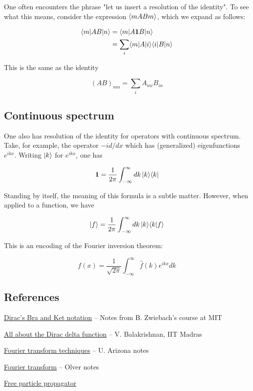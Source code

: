 One often encounters the phrase "let us insert a resolution of the identity".  To see what this means, consider the expression $\langle m AB m \rangle$, which we expand as follows:

\begin{align}
\langle m | AB  | n \rangle  &= \langle m | A {\bf 1}B | n \rangle \\
&= \sum_i \langle m | A | i \rangle \langle i | B | n \rangle
\end{align}

This is the same as the identity

\begin{equation}
(AB)_{mn} = \sum_i A_{mi} B_{in}
\end{equation}

\subsection{Continuous spectrum}

One also has resolution of the identity for operators with continuous spectrum.  Take, for example, the operator $-id/dx$ which has (generalized) eigenfunctions $e^{ikx}$. Writing $| k \rangle$ for $e^{ikx}$, one has

\begin{equation}
{\bf 1} = \frac{1}{2\pi} \int_{-\infty}^\infty dk\, | k \rangle \langle k |  
\end{equation}

Standing by itself, the meaning of this formula is a subtle matter.  However, when applied to a function, we have

\begin{equation}
| f \rangle = \frac{1}{2\pi} \int_{-\infty}^\infty dk\, | k \rangle \langle k | f \rangle 
\end{equation}

This is an encoding of the Fourier inversion theorem:

\begin{equation}
f(x) = \frac{1}{\sqrt{2\pi}} \int_{-\infty}^\infty \hat f(k) e^{ikx} dk
\end{equation}



\subsection{References}

\href{http://ocw.mit.edu/courses/physics/8-05-quantum-physics-ii-fall-2013/lecture-notes/MIT8_05F13_Chap_04.pdf}{Dirac's Bra and Ket notation} -- Notes from B. Zwiebach's course at MIT

\href{http://www.physics.iitm.ac.in/~labs/dynamical/pedagogy/vb/delta.pdf}{All about the Dirac delta function} -- V. Balakrishnan, IIT Madras

\href{http://math.arizona.edu/~kglasner/math456/fouriertransform.pdf}{Fourier transform techniques} -- U. Arizona notes

\href{https://www.math.utah.edu/~gustafso/s2013/3150/pdeNotes/fourierTransorm-PeterOlver2013.pdf}{Fourier transform} -- Olver notes

\href{http://www.physics.rutgers.edu/~steves/501/Lectures_Final/Lec06_Propagator.pdf}{Free particle propagator}


